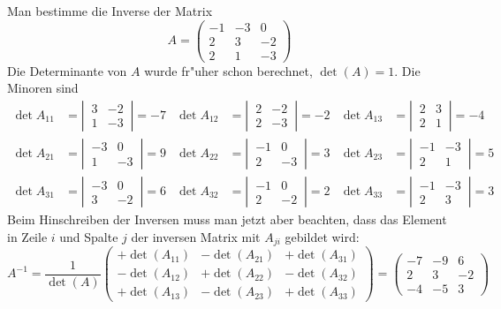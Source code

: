 \begin{beispiel}
Man bestimme die Inverse der Matrix
\[
A=\begin{pmatrix}
-1&-3&0\\
2&3&-2\\
2&1&-3
\end{pmatrix}
\]
Die Determinante von $A$ wurde fr"uher schon berechnet, $\det(A)=1$.
Die Minoren sind
\begin{align*}
\det A_{11}&=\left|\,\begin{matrix} 3&-2\\ 1&-3\end{matrix}\,\right|
=-7
&
\det A_{12}&=\left|\,\begin{matrix} 2&-2\\ 2&-3\end{matrix}\,\right|
=-2
&
\det A_{13}&=\left|\,\begin{matrix} 2& 3\\ 2& 1\end{matrix}\,\right|
=-4\\
\det A_{21}&=\left|\,\begin{matrix}-3& 0\\ 1&-3\end{matrix}\,\right|
=9
&
\det A_{22}&=\left|\,\begin{matrix}-1& 0\\ 2&-3\end{matrix}\,\right|
=3
&
\det A_{23}&=\left|\,\begin{matrix}-1&-3\\ 2& 1\end{matrix}\,\right|
=5\\
\det A_{31}&=\left|\,\begin{matrix}-3& 0\\ 3&-2\end{matrix}\,\right|
=6
&
\det A_{32}&=\left|\,\begin{matrix}-1& 0\\ 2&-2\end{matrix}\,\right|
=2
&
\det A_{33}&=\left|\,\begin{matrix}-1&-3\\ 2& 3\end{matrix}\,\right|
=3
\end{align*}
Beim Hinschreiben der Inversen muss man jetzt aber beachten,
dass das Element in Zeile $i$ und Spalte $j$ der inversen Matrix
mit $A_{ji}$ gebildet wird:
\[
A^{-1}=\frac1{\det(A)}\begin{pmatrix}
+\det(A_{11})&-\det(A_{21})&+\det(A_{31})\\
-\det(A_{12})&+\det(A_{22})&-\det(A_{32})\\
+\det(A_{13})&-\det(A_{23})&+\det(A_{33})
\end{pmatrix}
=\begin{pmatrix}
-7&-9&6\\
2&3&-2\\
-4&-5&3
\end{pmatrix}
\]
\end{beispiel}

